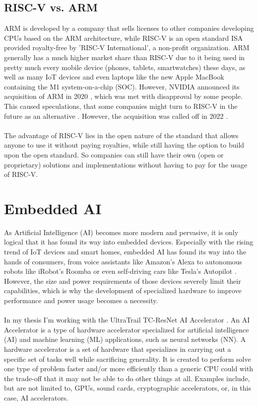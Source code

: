 \subsection{RISC-V vs. ARM}

ARM \cite{arm} is developed by a company that sells licenses to other companies developing CPUs based on the ARM architecture,
while RISC-V \cite{riscv} is an open standard ISA provided royalty-free by 'RISC-V International', a non-profit organization.
ARM generally has a much higher market share than RISC-V due to it being used in pretty much every mobile device (phones, tablets, smartwatches)
these days, as well as many IoT devices and even laptops like the new Apple MacBook containing the M1 system-on-a-chip (SOC).
However, NVIDIA announced its acquisition of ARM in 2020 \cite{arm_sale}, which was met with disapproval by some people.
This caused speculations, that some companies might turn to RISC-V in the future as an alternative \cite{arm_sale_speculation}.
However, the acquisition was called off in 2022 \cite{arm_sale_called_off}.\\\\
The advantage of RISC-V lies in the open nature of the standard that allows anyone to use it without paying royalties, while still
having the option to build upon the open standard.
So companies can still have their own (open or proprietary) solutions and implementations \cite{riscv_about} without having to pay for
the usage of RISC-V.

\section{Embedded AI}

As Artificial Intelligence (AI) becomes more modern and pervasive, it is only logical that it has found its way into embedded devices.
Especially with the rising trend of IoT devices and smart homes, embedded AI has found its way into the hands of consumers,
from voice assistants like Amazon's Alexa \cite{alexa} to autonomous robots like iRobot's Roomba \cite{roomba} or even self-driving cars like Tesla's Autopilot \cite{autopilot}.
However, the size and power requirements of those devices severely limit their capabilities, which is why the development of specialized hardware to improve performance
and power usage becomes a necessity.\\\\
In my thesis I'm working with the UltraTrail TC-ResNet AI Accelerator \cite{ultratrail}.
An AI Accelerator is a type of hardware accelerator specialized for artificial intelligence (AI) and machine learning (ML) applications, such as neural networks (NN).
A hardware accelerator is a set of hardware that specializes in carrying out a specific set of tasks well while sacrificing generality.
It is created to perform solve one type of problem faster and/or more efficiently than a generic CPU could with the trade-off that it may not be able to do other things at all.
Examples include, but are not limited to, GPUs, sound cards, cryptographic accelerators, or, in this case, AI accelerators.\\\\


